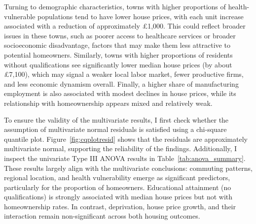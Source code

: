 \documentclass[12pt]{article}
\begin{document}
Turning to demographic characteristics, towns with higher proportions of health-vulnerable populations tend to have lower house prices, with each unit increase associated with a reduction of approximately £1,000. This could reflect broader issues in these towns, such as poorer access to healthcare services or broader socioeconomic disadvantage, factors that may make them less attractive to potential homeowners. Similarly, towns with higher proportions of residents without qualifications see significantly lower median house prices (by about £7,100), which may signal a weaker local labor market, fewer productive firms, and less economic dynamism overall. Finally, a higher share of manufacturing employment is also associated with modest declines in house prices, while its relationship with homeownership appears mixed and relatively weak.

To ensure the validity of the multivariate results, I first check whether the assumption of multivariate normal residuals is satisfied using a chi-square quantile plot. Figure~\ref{fig:cqplotresid} shows that the residuals are approximately multivariate normal, supporting the reliability of the findings. Additionally, I inspect the univariate Type III ANOVA results in Table~\ref{tab:anova_summary}. These results largely align with the multivariate conclusions: commuting patterns, regional location, and health vulnerability emerge as significant predictors, particularly for the proportion of homeowners. Educational attainment (no qualifications) is strongly associated with median house prices but not with homeownership rates. In contrast, deprivation, house price growth, and their interaction remain non-significant across both housing outcomes.
\end{document}
